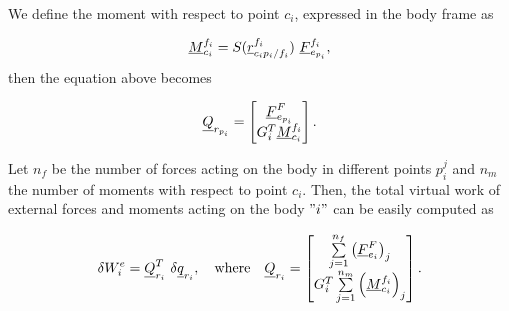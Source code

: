 We define the moment with respect to point $c_i$, expressed in the body 
frame as 

\[
    \vecd{M}_{c_i}^{f_i} = S(\pvec{r}{c_{i}p_{i}}{f_{i}}{f_{i}})\ \vecd{F}^{f_i}_{e_{p_i}},
\]
then the equation above becomes 

\begin{equation}
    \underline{Q}_{r_{p_i}} = 
    \begin{bmatrix}
        \underline{F}^{F}_{e_{p_i}} \\ G^{T}_{i} \underline{M}_{c_i}^{f_i} 
    \end{bmatrix}.
\end{equation}

Let $n_f$ be the number of forces acting on the body in different points 
$p^{j}_i$ and $n_m$ the number of moments with respect to point $c_i$.
Then, the total virtual work of external forces and moments 
acting on the body $"i"$ can be easily computed as  

\begin{equation}
    \delta W^{e}_{i} = \vecd{Q}^{T}_{r_i}\ \delta \vecd{q}_{r_{i}}, 
    \quad \text{where} \quad 
    \vecd{Q}_{r_i} = 
    \begin{bmatrix}
        \sum\limits_{j=1}^{n_f}\left(\vecd{F}^{F}_{e_i}\right)_j 
        \\ G^{T}_{i} \sum\limits_{j=1}^{n_m}\left(\vecd{M}_{c_i}^{f_i}\right)_j 

    \end{bmatrix}.
    \label{eq:virtual_work_rigid_body_external_forces}
\end{equation}






